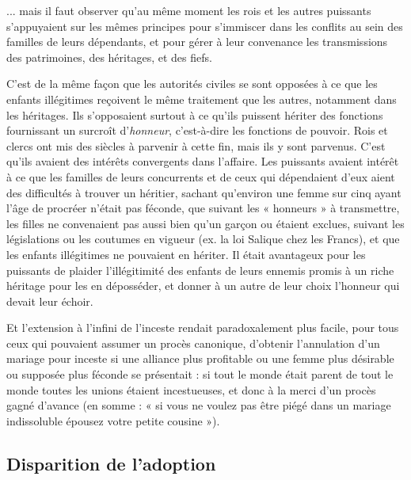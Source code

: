  ... mais il faut observer qu'au même moment les rois et les autres puissants s'appuyaient sur les mêmes principes pour s'immiscer dans les conflits au sein des familles de leurs dépendants, et pour gérer à leur convenance les transmissions des patrimoines, des héritages, et des fiefs. 

 C'est de la même façon que les autorités civiles se sont opposées à ce que les enfants illégitimes reçoivent le même traitement que les autres, notamment dans les héritages. Ils s'opposaient surtout à ce qu'ils puissent hériter des fonctions fournissant un surcroît d'\emph{honneur}, c'est-à-dire les fonctions de pouvoir. Rois et clercs ont mis des siècles à parvenir à cette fin, mais ils y sont parvenus. C'est qu'ils avaient des intérêts convergents dans l'affaire. Les puissants avaient intérêt à ce que les familles de leurs concurrents et de ceux qui dépendaient d'eux aient des difficultés à trouver un héritier, sachant qu'environ une femme sur cinq ayant l'âge de procréer n'était pas féconde, que suivant les « honneurs » à transmettre, les filles ne convenaient pas aussi bien qu'un garçon ou étaient exclues, suivant les législations ou les coutumes en vigueur (ex. la loi Salique chez les Francs), et que les enfants illégitimes ne pouvaient en hériter. Il était avantageux pour les puissants de plaider l'illégitimité des enfants de leurs ennemis promis à un riche héritage pour les en déposséder, et donner à un autre de leur choix l'honneur qui devait leur échoir. 

 Et l'extension à l'infini de l'inceste rendait paradoxalement plus facile, pour tous ceux qui pouvaient assumer un procès canonique, d'obtenir l'annulation d'un mariage pour inceste si une alliance plus profitable ou une femme plus désirable ou supposée plus féconde se présentait : si tout le monde était parent de tout le monde toutes les unions étaient incestueuses, et donc à la merci d'un procès gagné d'avance (en somme : « si vous ne voulez pas être piégé dans un mariage indissoluble épousez votre petite cousine »). 
 
 \subsection{Disparition de l'adoption}

